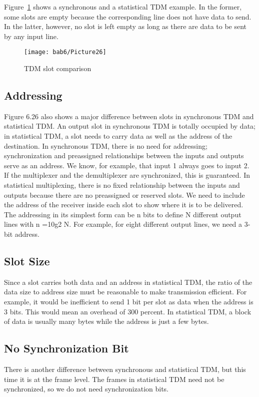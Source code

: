 Figure~\ref{fig6:25} shows a synchronous and a statistical TDM example. In the former, some slots are empty because the corresponding line does not have data to send. In the latter, however, no slot is left empty as long as there are data to be sent by any input line.

\begin{figure}[htbp]
  \centering
  \texttt{[image: bab6/Picture26]}
  \caption{TDM slot comparison}
  \label{fig6:25}
\end{figure}

\subsection*{Addressing}
Figure 6.26 also shows a major difference between slots in synchronous TDM and statistical TDM. An output slot in synchronous TDM is totally occupied by data; in statistical TDM, a slot needs to carry data as well as the address of the destination. In synchronous TDM, there is no need for addressing; synchronization and preassigned relationships between the inputs and outputs serve as an address. We know, for example, that input 1 always goes to input 2. If the multiplexer and the demultiplexer are synchronized, this is guaranteed. In statistical multiplexing, there is no fixed relationship between the inputs and outputs because there are no preassigned or reserved slots. We need to include the address of the receiver inside each slot to show where it is to be delivered. The addressing in its simplest form can be n bits to define N different output lines with n =10g2 N. For example, for eight different output lines, we need a 3-bit address.

\subsection*{Slot Size}
Since a slot carries both data and an address in statistical TDM, the ratio of the data size to address size must be reasonable to make transmission efficient. For example, it would be inefficient to send 1 bit per slot as data when the address is 3 bits. This would mean an overhead of 300 percent. In statistical TDM, a block of data is usually many bytes while the address is just a few bytes.

\subsection*{No Synchronization Bit}
There is another difference between synchronous and statistical TDM, but this time it is at the frame level. The frames in statistical TDM need not be synchronized, so we do not need synchronization bits.

